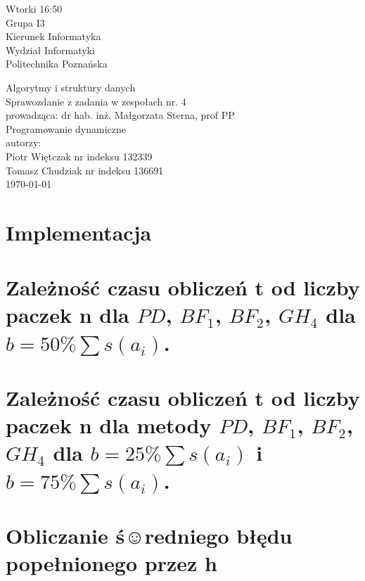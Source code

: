 \documentclass[polish,polish,a4paper]{article}
\begin{document}
	
		\begin{titlepage}
			\begin{flushright}
				{ Wtorki 16:50\\
					Grupa I3\\
					Kierunek Informatyka\\
					Wydział Informatyki\\
					Politechnika Poznańska}
			\end{flushright}
		\vspace*{\fill}
		\begin{center}
			{\Large Algorytmy i struktury danych \\[0.1cm]
				Sprawozdanie z zadania w zespołach nr. 4\\[0.1cm]
				prowadząca: dr hab. inż. Małgorzata Sterna, prof PP}\\
			{\Huge Programowanie dynamiczne\\ [0.4cm]}
			{\large autorzy:\\[0.1cm]}
			{\large Piotr Więtczak nr indeksu 132339\\[0.1cm] Tomasz Chudziak nr indeksu 136691}\\[0.5cm]
			\today
		\end{center}
		\vspace*{\fill}
	\end{titlepage}

\begin{spacing}{1.25}
	
	\section{Implementacja}
	\section{Zależność czasu obliczeń t od liczby paczek n dla $PD$, $BF_{1}$, $BF_{2}$, $GH_{4}$ dla $b = 50 \% \sum s (a_{i})$. }
	\section{Zależność czasu obliczeń t od liczby paczek n dla metody $PD$, $BF_{1}$, $BF_{2}$, $GH_{4}$ dla $b = 25 \% \sum s (a_{i})$ i $b = 75 \% \sum s (a_{i})$. }
	\section{Obliczanie ś☺redniego błędu popełnionego przez h}


\end{spacing}
	\newpage
	\tableofcontents
\end{document}
